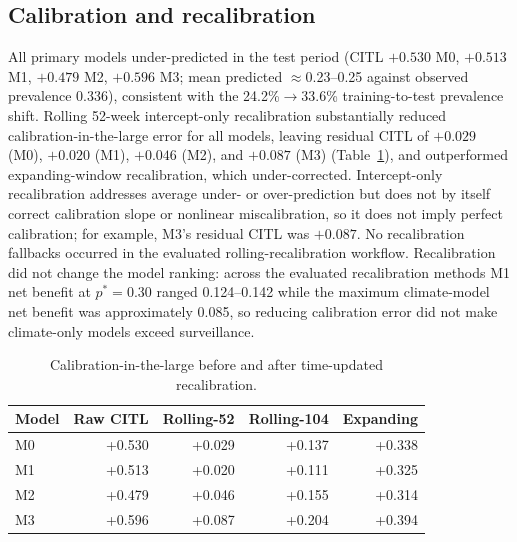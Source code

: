 \documentclass[11pt,a4paper]{article}
\begin{document}
\subsection{Calibration and recalibration}
All primary models under-predicted in the test period (CITL $+0.530$ M0, $+0.513$ M1, $+0.479$ M2, $+0.596$ M3; mean predicted $\approx$0.23--0.25 against observed prevalence 0.336), consistent with the 24.2\%$\rightarrow$33.6\% training-to-test prevalence shift. Rolling 52-week intercept-only recalibration substantially reduced calibration-in-the-large error for all models, leaving residual CITL of $+0.029$ (M0), $+0.020$ (M1), $+0.046$ (M2), and $+0.087$ (M3) (Table~\ref{tab:recal}), and outperformed expanding-window recalibration, which under-corrected. Intercept-only recalibration addresses average under- or over-prediction but does not by itself correct calibration slope or nonlinear miscalibration, so it does not imply perfect calibration; for example, M3's residual CITL was $+0.087$. No recalibration fallbacks occurred in the evaluated rolling-recalibration workflow. Recalibration did not change the model ranking: across the evaluated recalibration methods M1 net benefit at $p^*=0.30$ ranged 0.124--0.142 while the maximum climate-model net benefit was approximately 0.085, so reducing calibration error did not make climate-only models exceed surveillance.

\begin{table}[htbp]
\centering
\caption{Calibration-in-the-large before and after time-updated recalibration.}
\label{tab:recal}
\small
\begin{tabular}{lrrrr}
\toprule
Model & Raw CITL & Rolling-52 & Rolling-104 & Expanding \\
\midrule
M0 & +0.530 & +0.029 & +0.137 & +0.338 \\
M1 & +0.513 & +0.020 & +0.111 & +0.325 \\
M2 & +0.479 & +0.046 & +0.155 & +0.314 \\
M3 & +0.596 & +0.087 & +0.204 & +0.394 \\
\bottomrule
\end{tabular}
\end{table}
\end{document}

